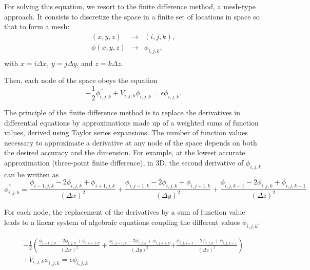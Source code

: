 \documentclass[11pt,a4paper]{article}
\begin{document}
For solving this equation, we resort to the finite difference method, a mesh-type approach\cite{varga2011,mazumder2015}.
It consists to discretize the space in a finite set of locations in space so that to form a mesh:
\begin{eqnarray}
  (x,y,z)&\rightarrow& (i,j,k), \\
  \phi(x,y,z)&\rightarrow& \phi_{i,j,k}, \\
\end{eqnarray}
with $x=i\Delta x$, $y=j\Delta y$, and $z=k\Delta z$.

Then, each node of the space obeys the equation
\begin{equation}
  \label{eq:eq1}
  -\frac{1}{2}\phi^{\prime\prime}_{i,j,k}+V_{i,j,k}\phi_{i,j,k}=\epsilon\phi_{i,j,k}.
\end{equation}

The principle of the finite difference method is to replace the derivatives in differential equations by approximations made up of a weighted sums of function values, derived using Taylor series expansions.
The number of function values necessary to approximate a derivative at any node  of the space depends on both the desired accuracy and the dimension.
For example, at the lowest accurate approximation (three-point finite difference), in  3D, the second derivative of $\phi_{i,j,k}$ can be written as
\begin{equation}
  \phi^{\prime\prime}_{i,j,k}=\frac{\phi_{i-1,j,k}-2\phi_{i,j,k}+\phi_{i+1,j,k}}{(\Delta x)^2}
+  \frac{\phi_{i,j-1,k}-2\phi_{i,j,k}+\phi_{i,j+1,k}}{(\Delta y)^2}
+  \frac{\phi_{i,j,k-1}-2\phi_{i,j,k}+\phi_{i,j,k-1}}{(\Delta z)^2}
\end{equation}

For each node, the replacement of the derivatives by a sum of function value leads to a linear system of algebraic equations coupling the different values $\phi_{i,j,k}$:

\begin{eqnarray}
  \label{eq:2}
-\frac{1}{2}\left(  \frac{\phi_{i-1,j,k}-2\phi_{i,j,k}+\phi_{i+1,j,k}}{(\Delta x)^2}\right.
 +  \frac{\phi_{i,j-1,k}-2\phi_{i,j,k}+\phi_{i,j+1,k}}{(\Delta y)^2}
 \left. +  \frac{\phi_{i,j,k-1}-2\phi_{i,j,k}+\phi_{i,j,k-1}}{(\Delta z)^2}\right)\nonumber\\
+V_{i,j,k} \phi_{i,j,k}=\epsilon\phi_{i,j,k}
\end{eqnarray}
\end{document}
